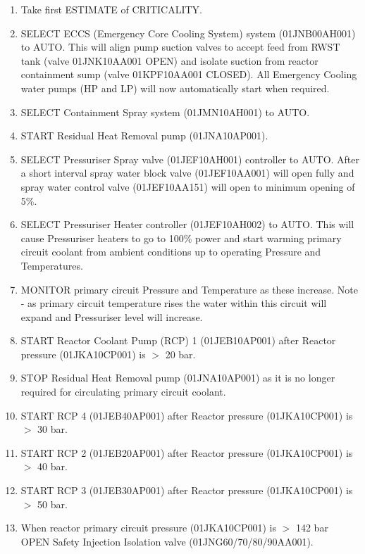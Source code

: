 \documentclass[10pt,a4paper]{article}
\begin{document}
\begin{enumerate}
\item Take first ESTIMATE of CRITICALITY.
\item SELECT ECCS (Emergency Core Cooling System) system (01JNB00AH001) to AUTO. This will align pump suction valves to accept feed from RWST tank (valve 01JNK10AA001 OPEN) and isolate suction from reactor containment sump (valve 01KPF10AA001 CLOSED). All Emergency Cooling water pumps (HP and LP) will now automatically start when required.
\item SELECT Containment Spray system (01JMN10AH001) to AUTO.
\item START Residual Heat Removal pump (01JNA10AP001).
\item SELECT Pressuriser Spray valve (01JEF10AH001) controller to AUTO. After a short interval spray water block valve (01JEF10AA001) will open fully and spray water control valve (01JEF10AA151) will open to minimum opening of 5\%.
\item SELECT Pressuriser Heater controller (01JEF10AH002) to AUTO. This will cause Pressuriser heaters to go to 100\% power and start warming primary circuit coolant from ambient conditions up to operating Pressure and Temperatures.
\item MONITOR primary circuit Pressure and Temperature as these increase. Note - as primary circuit temperature rises the water within this circuit will expand and Pressuriser level will increase.
\item START Reactor Coolant Pump (RCP) 1 (01JEB10AP001) after Reactor pressure (01JKA10CP001) is $>$ 20 bar.
\item STOP Residual Heat Removal pump (01JNA10AP001) as it is no longer required for circulating primary circuit coolant.
\item START RCP 4 (01JEB40AP001) after Reactor pressure (01JKA10CP001) is $>$ 30 bar.
\item START RCP 2 (01JEB20AP001) after Reactor pressure (01JKA10CP001) is $>$ 40 bar.
\item START RCP 3 (01JEB30AP001) after Reactor pressure (01JKA10CP001) is $>$ 50 bar.
\item When reactor primary circuit pressure (01JKA10CP001) is $>$ 142 bar OPEN Safety Injection Isolation valve (01JNG60/70/80/90AA001).

\end{enumerate}
\end{document}
